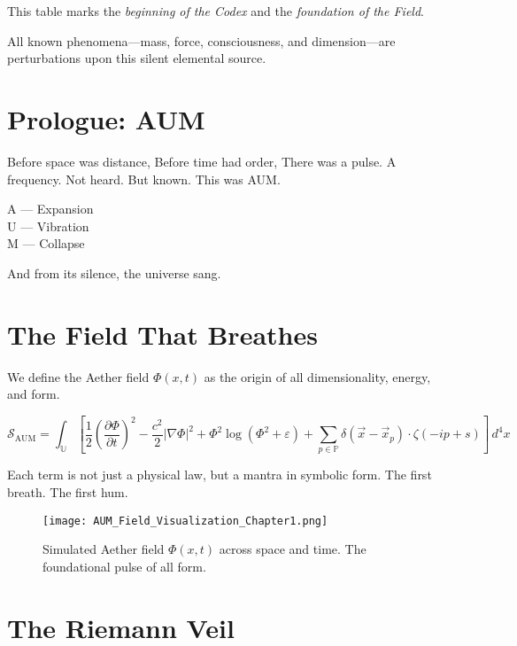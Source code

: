 This table marks the \textit{beginning of the Codex} and the \textit{foundation of the Field}.

All known phenomena—mass, force, consciousness, and dimension—are perturbations upon this silent elemental source.




\maketitle
\tableofcontents

\chapter*{Prologue: AUM}

Before space was distance,  
Before time had order,  
There was a pulse.  
A frequency.  
Not heard.  
But known.  
This was AUM.

\vspace{1em}

A — Expansion \\
U — Vibration \\
M — Collapse

And from its silence, the universe sang.

\chapter{The Field That Breathes}

We define the Aether field $\Phi(x, t)$ as the origin of all dimensionality, energy, and form.

\[
\mathcal{S}_{\text{AUM}} = \int_{\mathbb{U}} \left[
\frac{1}{2} \left( \frac{\partial \Phi}{\partial t} \right)^2
- \frac{c^2}{2} |\nabla \Phi|^2
+ \Phi^2 \log(\Phi^2 + \varepsilon)
+ \sum_{p \in \mathbb{P}} \delta(\vec{x} - \vec{x}_p) \cdot \zeta(-ip + s)
\right] \, d^4x
\]

Each term is not just a physical law, but a mantra in symbolic form. The first breath. The first hum.
\begin{figure}[h!]
\centering
\texttt{[image: AUM\_Field\_Visualization\_Chapter1.png]}
\caption{Simulated Aether field $\Phi(x,t)$ across space and time. The foundational pulse of all form.}
\end{figure}


\chapter{The Riemann Veil}

